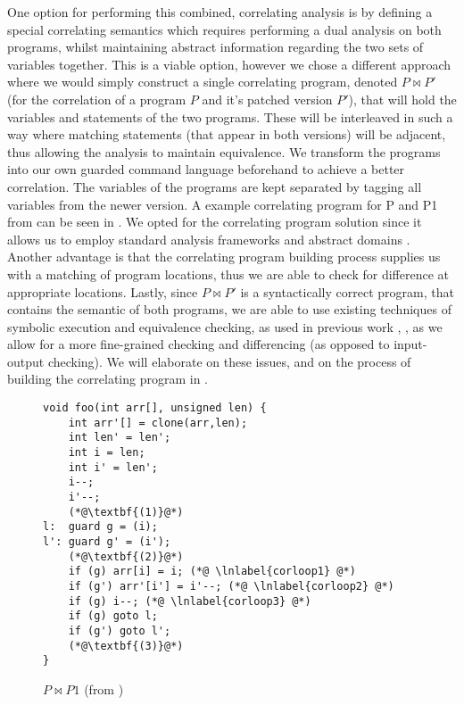 One option for performing this combined, correlating analysis is by defining a special correlating semantics which requires performing a dual analysis on both programs, whilst maintaining abstract information regarding the two sets of variables together. This is a viable option, however we chose a different approach where we would simply construct a single correlating program, denoted $P \bowtie P'$ (for the correlation of a program $P$ and it's patched version $P'$), that will hold the variables and statements of the two programs. These will be interleaved in such a way where matching statements (that appear in both versions) will be adjacent, thus allowing the analysis to maintain equivalence. We transform the programs into our own guarded command language beforehand to achieve a better correlation. The variables of the programs are kept separated by tagging all variables from the newer version. A example correlating program for P and P1 from  can be seen in . We opted for the correlating program solution since it allows us to employ standard analysis frameworks \cite{CLang} and abstract domains \cite{JeannetMine09}. Another advantage is that the correlating program building process supplies us with a matching of program locations, thus we are able to check for difference at appropriate locations. Lastly, since $P \bowtie P'$ is a syntactically correct program, that contains the semantic of both programs, we are able to use existing techniques of symbolic execution and equivalence checking, as used in previous work \cite{GodlinStrichman09,DwyerElbaumPerson08,EnglerRamos11}, , as we allow for a more fine-grained checking and differencing (as opposed to input-output checking). We will elaborate on these issues, and on the process of building the correlating program in .

\begin{figure}
\centering
\lstset{numbers=left}
\begin{lstlisting}
void foo(int arr[], unsigned len) {
    int arr'[] = clone(arr,len);
    int len' = len';
    int i = len;
    int i' = len';
    i--;
    i'--;
    (*@\textbf{(1)}@*)
l:  guard g = (i);
l': guard g' = (i');
    (*@\textbf{(2)}@*)
    if (g) arr[i] = i; (*@ \lnlabel{corloop1} @*)
    if (g') arr'[i'] = i'--; (*@ \lnlabel{corloop2} @*)
    if (g) i--; (*@ \lnlabel{corloop3} @*)
    if (g) goto l;
    if (g') goto l';
    (*@\textbf{(3)}@*)
}
\end{lstlisting}
\caption{$P \bowtie P1$ (from )}
\end{figure}

